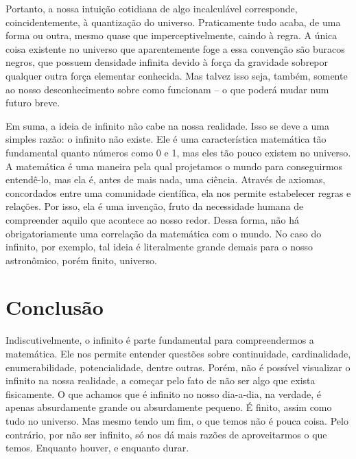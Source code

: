 \documentclass[journal,transmag]{IEEEtran}
\begin{document}
Portanto, a nossa intuição cotidiana de algo incalculável corresponde,
coincidentemente, à quantização do universo. Praticamente tudo acaba, de uma
forma ou outra, mesmo quase que imperceptivelmente, caindo à regra.
A única coisa existente no universo que aparentemente
foge a essa convenção são buracos negros, que possuem densidade infinita devido
à força da gravidade sobrepor qualquer outra força elementar conhecida. Mas talvez
isso seja, também, somente ao nosso desconhecimento sobre como funcionam -- o que
poderá mudar num futuro breve.

Em suma, a ideia de infinito não cabe na nossa realidade. Isso se deve a uma
simples razão: o infinito não existe. Ele é uma característica matemática tão
fundamental quanto números como 0 e 1, mas eles tão pouco existem no universo.
A matemática é uma maneira pela qual projetamos o mundo para conseguirmos
entendê-lo, mas ela é, antes de mais nada, uma ciência. Através de axiomas,
concordados entre uma comunidade científica, ela nos permite estabelecer regras
e relações. Por isso, ela é uma invenção, fruto da necessidade humana de compreender
aquilo que acontece ao nosso redor. Dessa forma, não há obrigatoriamente uma
correlação da matemática com o mundo. No caso do infinito, por exemplo, tal ideia
é literalmente grande demais para o nosso astronômico, porém finito, universo.




\section{Conclusão}
Indiscutivelmente, o infinito é parte fundamental para compreendermos
a matemática. Ele nos permite entender questões sobre continuidade, cardinalidade,
enumerabilidade, potencialidade, dentre outras. Porém, não é possível visualizar
o infinito na nossa realidade, a começar pelo fato de não ser algo que exista
fisicamente. O que achamos que é infinito no nosso dia-a-dia, na verdade, é apenas
absurdamente grande ou absurdamente pequeno. É finito, assim como tudo no
universo. Mas mesmo tendo um fim, o que temos não é pouca coisa. Pelo contrário,
por não ser infinito, só nos dá mais razões de aproveitarmos o que temos.
Enquanto houver, e enquanto durar.
\end{document}

